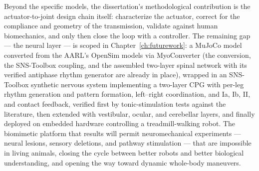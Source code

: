 Beyond the specific models, the dissertation's methodological contribution is the actuator-to-joint design chain itself: characterize the actuator, correct for the compliance and geometry of the transmission, validate against human biomechanics, and only then close the loop with a controller. The remaining gap --- the neural layer --- is scoped in Chapter~\ref{ch:futurework}: a MuJoCo model converted from the AARL's OpenSim models via MyoConverter (the conversion, the SNS-Toolbox coupling, and the assembled two-layer spinal network with its verified antiphase rhythm generator are already in place), wrapped in an SNS-Toolbox synthetic nervous system implementing a two-layer CPG with per-leg rhythm generation and pattern formation, left--right coordination, and Ia, Ib, II, and contact feedback, verified first by tonic-stimulation tests against the literature, then extended with vestibular, ocular, and cerebellar layers, and finally deployed on embedded hardware controlling a treadmill-walking robot. The biomimetic platform that results will permit neuromechanical experiments --- neural lesions, sensory deletions, and pathway stimulation --- that are impossible in living animals, closing the cycle between better robots and better biological understanding, and opening the way toward dynamic whole-body maneuvers.

